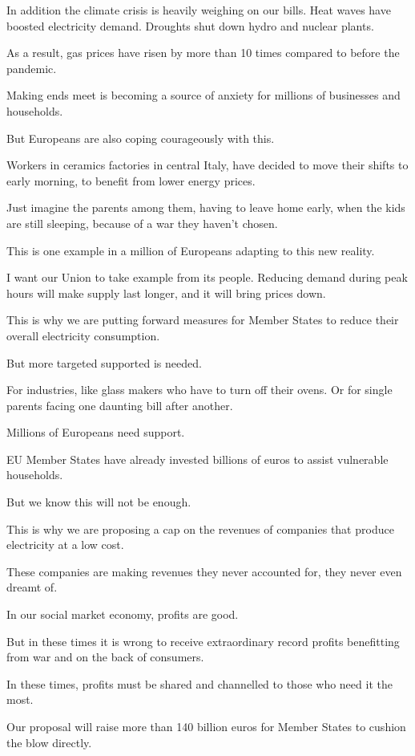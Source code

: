 \documentclass[a4paper,11pt]{article}
\begin{document}
In addition the climate crisis is heavily weighing on our bills. Heat waves have boosted electricity demand. Droughts shut down hydro and nuclear plants.

As a result, gas prices have risen by more than 10 times compared to before the pandemic.

Making ends meet is becoming a source of anxiety for millions of businesses and households.

But Europeans are also coping courageously with this.

Workers in ceramics factories in central Italy, have decided to move their shifts to early morning, to benefit from lower energy prices.

Just imagine the parents among them, having to leave home early, when the kids are still sleeping, because of a war they haven't chosen.

This is one example in a million of Europeans adapting to this new reality.

I want our Union to take example from its people. Reducing demand during peak hours will make supply last longer, and it will bring prices down. 

This is why we are putting forward measures for Member States to reduce their overall electricity consumption.

But more targeted supported is needed.

For industries, like glass makers who have to turn off their ovens. Or for single parents facing one daunting bill after another. 

Millions of Europeans need support.

EU Member States have already invested billions of euros to assist vulnerable households.

But we know this will not be enough.

This is why we are proposing a cap on the revenues of companies that produce electricity at a low cost.

These companies are making revenues they never accounted for, they never even dreamt of.

In our social market economy, profits are good.

But in these times it is wrong to receive extraordinary record profits benefitting from war and on the back of consumers.

In these times, profits must be shared and channelled to those who need it the most.

Our proposal will raise more than 140 billion euros for Member States to cushion the blow directly.
\end{document}
